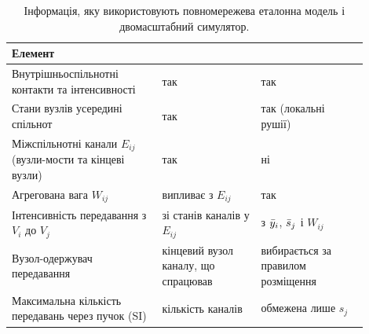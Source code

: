 \clearpage
\begin{table}[H]
\centering
\caption{Інформація, яку використовують повномережева еталонна модель і двомасштабний симулятор.}
\label{tab:information}
\small
\begin{tabular}{>{\raggedright\arraybackslash}p{0.38\linewidth}>{\raggedright\arraybackslash}p{0.25\linewidth}>{\raggedright\arraybackslash}p{0.27\linewidth}}
\toprule
Елемент & \Full{} & \TS{}\\
\midrule
Внутрішньоспільнотні контакти та інтенсивності & так & так\\
Стани вузлів усередині спільнот & так & так (локальні рушії)\\
Міжспільнотні канали $E_{ij}$ (вузли-мости та кінцеві вузли) & так & ні\\
Агрегована вага $W_{ij}$ & випливає з $E_{ij}$ & так\\
Інтенсивність передавання з $V_i$ до $V_j$ & зі станів каналів у $E_{ij}$ & з $\bar{y}_i$, $\bar{s}_j$ і $W_{ij}$\\
Вузол-одержувач передавання & кінцевий вузол каналу, що спрацював & вибирається за правилом розміщення\\
Максимальна кількість передавань через пучок (SI) & кількість каналів & обмежена лише $s_j$\\
\bottomrule
\end{tabular}
\end{table}

